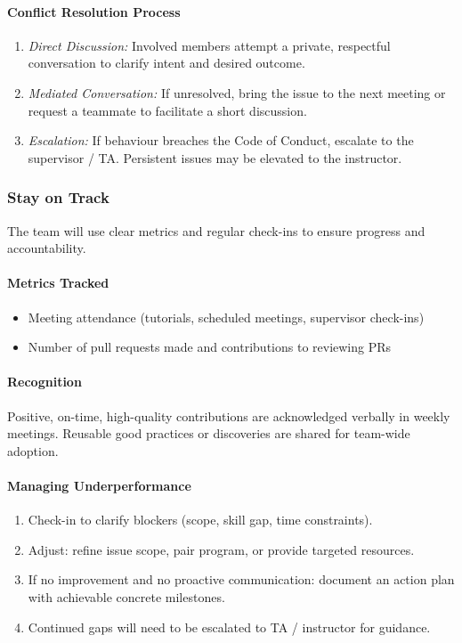 \documentclass{article}
\begin{document}
\paragraph{Conflict Resolution Process}
\begin{enumerate}
  \item \textit{Direct Discussion:} Involved members attempt a private, respectful conversation to clarify intent and desired outcome.
  \item \textit{Mediated Conversation:} If unresolved, bring the issue to the next meeting or request a teammate to facilitate a short discussion.
  \item \textit{Escalation:} If behaviour breaches the Code of Conduct, escalate to the supervisor / TA. Persistent issues may be elevated to the instructor.
\end{enumerate}

\subsubsection*{Stay on Track}
The team will use clear metrics and regular check-ins to ensure progress and accountability.

\paragraph{Metrics Tracked}
\begin{itemize}
  \item Meeting attendance (tutorials, scheduled meetings, supervisor check-ins)
  \item Number of pull requests made and contributions to reviewing PRs
\end{itemize}

\paragraph{Recognition}
Positive, on-time, high-quality contributions are acknowledged verbally in weekly meetings. Reusable good practices or discoveries are shared for team-wide adoption.

\paragraph{Managing Underperformance}
\begin{enumerate}
  \item Check-in to clarify blockers (scope, skill gap, time constraints).
  \item Adjust: refine issue scope, pair program, or provide targeted resources.
  \item If no improvement and no proactive communication: document an action plan with achievable concrete milestones.
  \item Continued gaps will need to be escalated to TA / instructor for guidance.
\end{enumerate}
\end{document}
